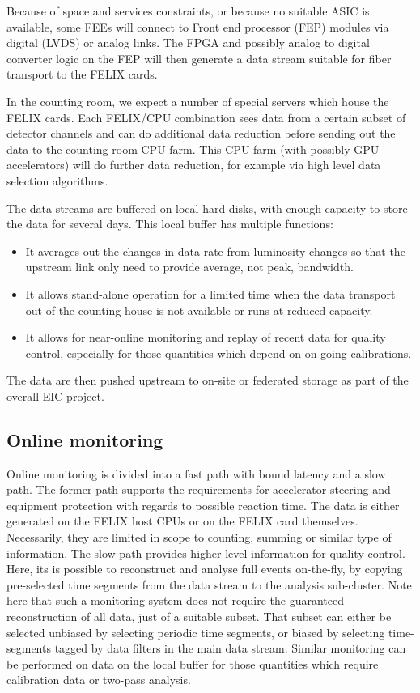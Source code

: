Because of space and services constraints, or because no suitable ASIC is available, some FEEs will connect to Front end processor (FEP) modules via digital (LVDS) or analog links. The FPGA and possibly analog to digital converter logic on the FEP will then generate a data stream suitable for fiber transport to the FELIX cards.

In the counting room, we expect a number of special servers which house the FELIX cards. Each FELIX/CPU combination sees data from a certain subset of detector channels and can do additional data reduction before sending out the data to the counting room CPU farm. This CPU farm (with possibly GPU accelerators) will do further data reduction, for example via high level data selection algorithms.

The data streams are buffered on local hard disks, with enough capacity to store the data for several days. This local buffer has multiple functions: 
\begin{itemize}
    \item It averages out the changes in data rate from luminosity changes so that the upstream link only need to provide average, not peak, bandwidth.
    \item It allows stand-alone operation for a limited time when the data transport out of the counting house is not available or runs at reduced capacity.
    \item It allows for near-online monitoring and replay of recent data for quality control, especially for those quantities which depend on on-going calibrations.        
\end{itemize}

The data are then pushed upstream to on-site or federated storage as part of the overall EIC project.


\subsection{Online monitoring}
Online monitoring is divided into a fast path with bound latency and a slow path. The former path supports the requirements for accelerator steering and equipment protection with regards to possible reaction time. The data is either generated on the FELIX host CPUs or on the FELIX card themselves. Necessarily, they are limited in scope to counting, summing or similar type of information. The slow path provides higher-level information for quality control. Here, its is possible to reconstruct and analyse full events on-the-fly, by copying pre-selected time segments from the data stream to the analysis sub-cluster. Note here that such a monitoring system does not require the guaranteed reconstruction of all data, just of a suitable subset. That subset can either be selected unbiased by selecting periodic time segments, or biased by selecting time-segments tagged by data filters in the main data stream.  Similar monitoring can be performed on data on the local buffer for those quantities which require calibration data or two-pass analysis.

